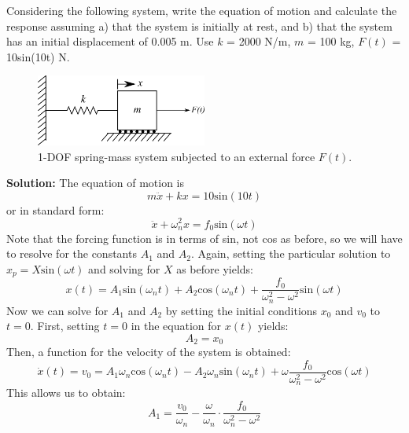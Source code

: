 \documentclass[12pt,letter]{article}
\begin{document}
\begin{example}
	Considering the following system, write the equation of motion and calculate the response assuming a) that the system is initially at rest, and b) that the system has an initial displacement of 0.005 m. Use $k$ = 2000 N/m, $m$ = 100 kg, $F(t)$ = 10sin(10t) N.
	\begin{figure}[H]
		\centering
		\includegraphics[width=0.5\textwidth]{../figures/1-DOF-spring_mass_horizontal_forced.png}
		\caption{1-DOF spring-mass system subjected to an external force $F(t)$.}
	\end{figure}
	\noindent\textbf{Solution:} The equation of motion is
	\begin{equation}
		m\ddot{x}+kx=10\text{sin}(10t)
	\end{equation}
	or in standard form:
	\begin{equation}
		\ddot{x}+\omega_n^2x=f_0\text{sin}(\omega t)
	\end{equation}							
	Note that the forcing function is in terms of sin, not cos as before, so we will have to resolve for the constants $A_1$ and $A_2$. Again, setting the particular solution to $x_p=X\text{sin}(\omega t)$ and solving for $X$ as before yields:
	\begin{equation}
		x(t) = A_1\text{sin}(\omega_n t) + A_2\text{cos}(\omega_n t) + \frac{f_0}{\omega_n^2-\omega^2}\text{sin}(\omega t)
	\end{equation}	
	Now we can solve for $A_1$ and $A_2$ by setting the initial conditions $x_0$ and $v_0$ to $t=0$. First, setting $t=0$ in the equation for $x(t)$ yields:
	\begin{equation}
		A_2 = x_0
	\end{equation}	
	Then, a function for the velocity of the system is obtained: 
	\begin{equation}
		\dot{x}(t) = v_0 = A_1\omega_n\text{cos}(\omega_n t) - A_2\omega_n\text{sin}(\omega_n t) + \omega\frac{f_0}{\omega_n^2-\omega^2}\text{cos}(\omega t)
	\end{equation}				
	This allows us to obtain:
	\begin{equation}
		A_1 = \frac{v_0}{\omega_n}-\frac{\omega}{\omega_n}\cdot \frac{f_0}{\omega_n^2-\omega^2}
	\end{equation}	

\end{example}
\end{document}
